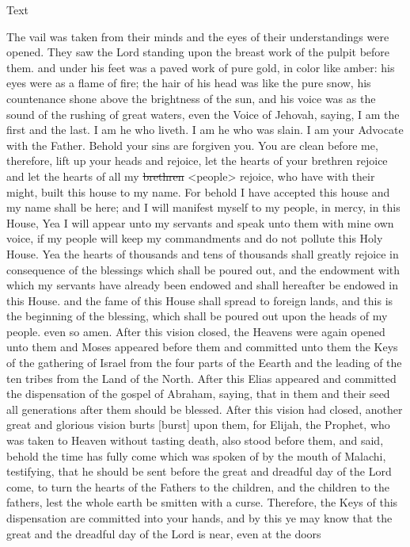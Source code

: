 				\begin{description}
					\item[Text]
				\end{description}
				
					The vail was taken from their minds and the eyes of their understandings were opened. They saw the Lord standing upon the breast work of the pulpit before them. and under his feet was a paved work of pure gold, in color like amber: his eyes were as a flame of fire; the hair of his head was like the pure snow, his countenance shone above the brightness of the sun, and his voice was as the sound of the rushing of great waters, even the Voice of Jehovah, saying, I am the first and the last. I am he who liveth. I am he who was slain. I am your Advocate with the Father. Behold your sins are forgiven you. You are clean before me, therefore, lift up your heads and rejoice, let the hearts of your brethren rejoice and let the hearts of all my \sout{brethren} <people> rejoice, who have with their might, built this house to my name. For behold I have accepted this house and my name shall be here; and I will manifest myself to my people, in mercy, in this House, Yea I will appear unto my servants and speak unto them with mine own voice, if my people will keep my commandments and do not pollute this Holy House. Yea the hearts of thousands and tens of thousands shall greatly rejoice in consequence of the blessings which shall be poured out, and the endowment with which my servants have already been endowed and shall hereafter be endowed in this House. and the fame of this House shall spread to foreign lands, and this is the beginning of the blessing, which shall be poured out upon the heads of my people. even so amen. After this vision closed, the Heavens were again opened unto them and Moses appeared before them and committed unto them the Keys of the gathering of Israel from the four parts of the Eearth and the leading of the ten tribes from the Land of the North. After this Elias appeared and committed the dispensation of the gospel of Abraham, saying, that in them and their seed all generations after them should be blessed. After this vision had closed, another great and glorious vision burts [burst] upon them, for Elijah, the Prophet, who was taken to Heaven without tasting death, also stood before them, and said, behold the time has fully come which was spoken of by the mouth of Malachi, testifying, that he should be sent before the great and dreadful day of the Lord come, to turn the hearts of the Fathers to the children, and the children to the fathers, lest the whole earth be smitten with a curse. Therefore, the Keys of this dispensation are committed into your hands, and by this ye may know that the great and the dreadful day of the Lord is near, even at the doors
					
